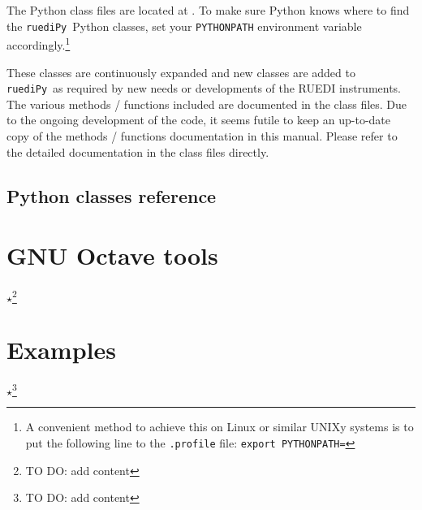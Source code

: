 \documentclass[12pt]{article}   	%
\newcommand{\ruediPy}{\texttt{ruediPy}}
\newcommand{\work}[1]{{\Large\bf\ensuremath{\star}}\footnote{TO DO: #1}}
\begin{document}
The Python class files are located at . To make sure Python knows where to find the \ruediPy\ Python classes, set your \texttt{PYTHONPATH} environment variable accordingly.\footnote{A convenient method to achieve this on Linux or similar UNIXy systems is to put the following line to the \texttt{.profile} file: 
 \texttt{export PYTHONPATH=}}

These classes are continuously expanded and new classes are added to \ruediPy\ as required by new needs or developments of the RUEDI instruments. The various methods / functions included are documented in the class files. Due to the ongoing development of the code, it seems futile to keep an up-to-date copy of the methods / functions documentation in this manual. Please refer to the detailed documentation in the class files directly.

\subsection{Python classes reference}


\section{GNU Octave tools}
\work{add content}

\section{Examples}
\work{add content}


\end{document}
